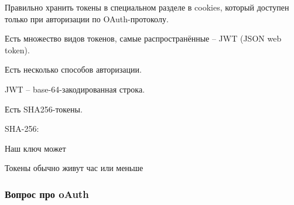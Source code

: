 \documentclass[main.tex]{subfiles}
\begin{document}
Правильно хранить токены в специальном разделе в cookies, который доступен только при авторизации по OAuth-протоколу.

Есть множество видов токенов, самые распространённые -- JWT (JSON web token).


Есть несколько способов авторизации.

JWT -- base-64-закодированная строка.

Есть SHA256-токены.

SHA-256: 

Наш ключ может 

Токены обычно живут час или меньше


\subsubsection{Вопрос про oAuth}
\end{document}
